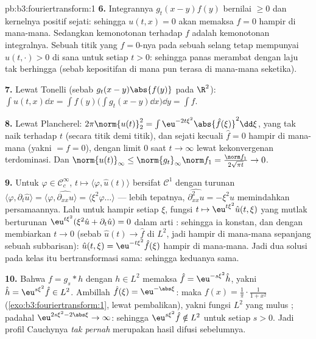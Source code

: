 \begin{solution}{pb:b3:fouriertransform:1}
\textbf{6.} Integrannya $g_t(x-y)f(y)$ bernilai $\geq 0$ dan
kernelnya positif sejati: sehingga $u(t,x) = 0$ akan memaksa $f = 0$
hampir di mana-mana. Sedangkan kemonotonan terhadap $f$ adalah kemonotonan integralnya. Sebuah
titik yang $f = 0$-nya pada sebuah selang tetap mempunyai $u(t, \cdot) > 0$
di sana untuk setiap $t > 0$: sehingga panas merambat dengan laju tak berhingga
(sebab kepositifan di mana pun terasa di mana-mana seketika).

\textbf{7.} Lewat Tonelli (sebab $g_t(x-y)\abs{f(y)}$  pada
$\R^2$): $\int u(t,x)\dd x = \int f(y)\bigl(\int g_t(x -
y)\dd x\bigr)\dd y = \int f$.

\textbf{8.} Lewat Plancherel: $2\pi\norm{u(t)}_2^2 =
\int\eu^{-2t\xi^2}\abs{\hat f(\xi)}^2\dd\xi$, yang tak naik terhadap
$t$ (secara titik demi titik), dan sejati kecuali $\hat f = 0$ hampir di mana-mana (yakni $= f =
0$), dengan limit $0$ saat $t\to\infty$ lewat kekonvergenan terdominasi. Dan
$\norm{u(t)}_\infty \leq \norm{g_t}_\infty\norm f_1 =
\frac{\norm f_1}{2\sqrt{\pi t}} \to 0$.

\textbf{9.} Untuk $\varphi \in \mathcal C_c^\infty$, $t \mapsto
\langle\varphi, \hat u(t)\rangle$ bersifat $\mathcal C^1$ dengan
turunan $\langle\varphi, \partial_t\hat u\rangle =
\langle\varphi, \widehat{\partial_{xx}u}\rangle =
\langle\xi^2\varphi\dots\rangle$ --- lebih tepatnya,
$\widehat{\partial^2_{xx}u} = -\xi^2\hat u$ memindahkan
persamaannya. Lalu untuk hampir setiap $\xi$, fungsi $t \mapsto \eu^{t\xi^2}\hat u(t,\xi)$
yang  mutlak berturunan
$\eu^{t\xi^2}(\xi^2\hat u + \partial_t\hat u) = 0$ dalam
arti : sehingga ia konstan, dan dengan membiarkan $t \to 0$
(sebab $\hat u(t) \to \hat f$ di $L^2$, jadi hampir di mana-mana sepanjang sebuah subbarisan):
$\hat u(t, \xi) = \eu^{-t\xi^2}\hat f(\xi)$ hampir di mana-mana. Jadi dua
solusi pada kelas itu bertransformasi sama: sehingga keduanya
sama.

\textbf{10.} Bahwa $f = g_s * h$ dengan $h \in L^2$ memaksa $\hat f =
\eu^{-s\xi^2}\hat h$, yakni $\hat h = \eu^{s\xi^2}\hat f \in
L^2$. Ambillah $\hat f(\xi) = \eu^{-\abs\xi}$: maka $f(x) =
\frac1\pi\cdot\frac1{1 + x^2}$
(\cref{exo:b3:fouriertransform:1}, lewat pembalikan), yakni fungsi $L^2$
yang mulus ; padahal $\eu^{2s\xi^2 - 2\abs\xi} \to
\infty$: sehingga $\eu^{s\xi^2}\hat f \notin L^2$ untuk setiap $s > 0$.
Jadi profil Cauchynya \emph{tak pernah} merupakan hasil difusi
sebelumnya.


\end{solution}
